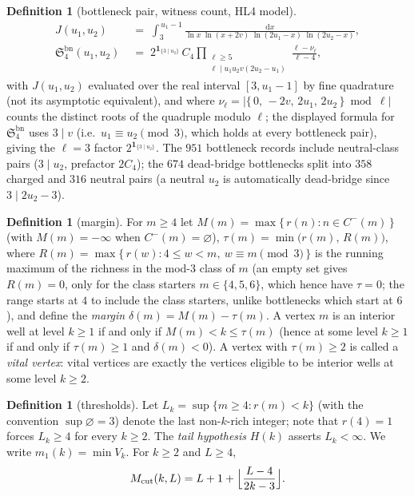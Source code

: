 \documentclass[11pt]{article}
\theoremstyle{plain}
\theoremstyle{definition}
\newtheorem{definition}[theorem]{Definition}
\newcommand{\rch}{r}
\newcommand{\Vk}{V_{k}}
\newcommand{\Mcut}{M_{\mathrm{cut}}}
\newcommand{\dd}{\mathrm{d}}
\begin{document}
\begin{definition}[bottleneck pair, witness count, HL4 model]
\begin{align*}
J(u_1,u_2) &\;=\; \int_{3}^{\,u_1 - 1}
\frac{\dd x}
{\ln x\;\ln(x + 2v)\;\ln(2u_1 - x)\;\ln(2u_2 - x)},\\[1ex]
\mathfrak{S}_4^{\mathrm{bn}}(u_1,u_2) &\;=\;
2^{\mathbf{1}_{\{3 \mid u_2\}}}\, C_4
\prod_{\substack{\ell \ge 5\\
\ell \mid u_1 u_2 v (2u_2 - u_1)}}
\frac{\ell - \nu_\ell}{\ell - 4},
\end{align*}
with $J(u_1,u_2)$ evaluated over the real interval $[3, u_1-1]$ by
fine quadrature (not its asymptotic equivalent), and where
$\nu_\ell = |\{\,0,\, -2v,\, 2u_1,\, 2u_2\,\} \bmod \ell|$ counts
the distinct roots of the quadruple modulo $\ell$; the displayed
formula for $\mathfrak{S}_4^{\mathrm{bn}}$ uses $3 \mid v$ (i.e.\
$u_1 \equiv u_2 \pmod 3$, which holds at every bottleneck pair),
giving the $\ell = 3$ factor $2^{\mathbf{1}_{\{3 \mid u_2\}}}$. The
$951$ bottleneck records include neutral-class pairs ($3 \mid u_2$,
prefactor $2C_4$); the $674$ dead-bridge bottlenecks split into
$358$ charged and $316$ neutral pairs (a neutral $u_2$ is
automatically dead-bridge since $3 \mid 2u_2 - 3$).
\end{definition}

\begin{definition}[margin]\label{def:margin}
For $m \ge 4$ let
$M(m) = \max\{\,\rch(n) : n \in C^{-}(m)\,\}$
(with $M(m) = -\infty$ when $C^{-}(m) = \varnothing$),
$\tau(m) = \min\bigl(\rch(m),\, R(m)\bigr)$, where
$R(m) = \max\{\,\rch(w) : 4 \le w < m,\ w \equiv m \pmod 3\,\}$
is the running maximum of the richness in the mod-3 class of $m$
(an empty set gives $R(m) = 0$, only for the class starters
$m \in \{4, 5, 6\}$, which hence have $\tau = 0$; the range starts
at $4$ to include the class starters, unlike bottlenecks which
start at $6$), and define the
\emph{margin} $\delta(m) = M(m) - \tau(m)$. A vertex $m$ is an
interior well at level $k \ge 1$ if and only if
$M(m) < k \le \tau(m)$ (hence at some level $k \ge 1$ if and only if
$\tau(m) \ge 1$ and $\delta(m) < 0$). A vertex with
$\tau(m) \ge 2$ is called a \emph{vital vertex}: vital vertices
are exactly the
vertices eligible to be interior wells at some level $k \ge 2$.
\end{definition}

\begin{definition}[thresholds]\label{def:thresholds}
Let $L_k = \sup\{m \ge 4 : \rch(m) < k\}$ (with the convention
$\sup\varnothing = 3$) denote the last non-$k$-rich integer; note that
$\rch(4) = 1$ forces $L_k \ge 4$ for every $k \ge 2$. The
\emph{tail hypothesis} $H(k)$ asserts $L_k < \infty$. We write
$m_1(k) = \min \Vk$. For $k \ge 2$ and $L \ge 4$,
\[
\Mcut(k,L) = L + 1 + \Bigl\lfloor \frac{L - 4}{2k - 3} \Bigr\rfloor .
\]
\end{definition}
\end{document}
